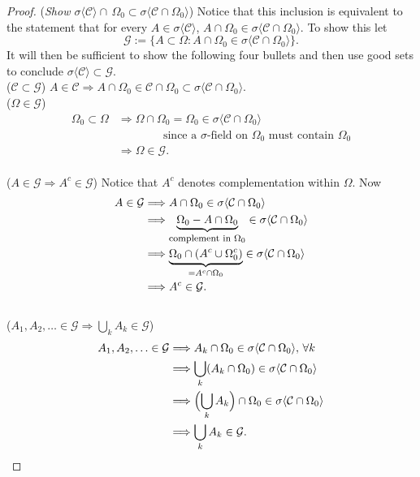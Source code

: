 \begin{proof}
({\sl Show  $\sigma\langle \mathcal C \rangle \cap\, \Omega_0 \subset \sigma \langle  \mathcal C \cap \Omega_0 \rangle $})  Notice that this inclusion is
equivalent to the statement that for every $A\in \sigma\langle\mathcal C\rangle$, $A\cap \Omega_0\in \sigma\langle\mathcal C\cap \Omega_0\rangle.$  To show this  let
\[ \mathcal G:=\{ A\subset \Omega: A\cap \Omega_0 \in \sigma\langle \mathcal C \cap \Omega_0 \rangle \}. \]
It will then be sufficient to show the following four bullets and then use good sets to conclude $\sigma\langle\mathcal C \rangle\subset \mathcal G$.
\\
\textbullet($\mathcal C\subset \mathcal G$)
$A\in \mathcal C \Longrightarrow A\cap \Omega_0\in \mathcal C \cap \Omega_0 \subset \sigma\langle \mathcal C \cap \Omega_0 \rangle.  $
\\
\textbullet($\Omega \in \mathcal G$)
\begin{align*}
\Omega_0\subset \Omega
&\Longrightarrow \Omega \cap \Omega_0 = \Omega_0 \in \sigma\langle \mathcal C\cap \Omega_0\rangle\\
&\qquad\qquad\text{since a  $\sigma$-field on $\Omega_0$ must contain $\Omega_0$} \\
&\Longrightarrow \Omega \in \mathcal G.
\end{align*}
\\
\textbullet($A\in \mathcal G\Longrightarrow A^c \in \mathcal G$) Notice that $A^c$  denotes complementation within $\Omega$. Now
\begin{align*}
A\in\mathcal G&\Longrightarrow A\cap \Omega_0\in \sigma\langle \mathcal C\cap \Omega_0\rangle \\
&\Longrightarrow \underbrace{\Omega_0-A\cap \Omega_0}_\text{\footnotesize complement in $\Omega_0$}\in \sigma\langle \mathcal C\cap \Omega_0\rangle \\
&\Longrightarrow \underbrace{\Omega_0\cap (A^c\cup \Omega_0^c)}_{= A^c\cap\Omega_0}\in \sigma\langle \mathcal C\cap \Omega_0\rangle \\
&\Longrightarrow A^c\in\mathcal G.
\end{align*}
\\
\textbullet($A_1,A_2,\ldots \in \mathcal G \Longrightarrow \bigcup_k A_k\in \mathcal G$)
\begin{align*}
A_1,A_2,\ldots \in \mathcal G&\Longrightarrow A_k\cap \Omega_0 \in \sigma\langle \mathcal C\cap \Omega_0\rangle,\,\forall k \\
&\Longrightarrow  \bigcup_k (A_k\cap \Omega_0) \in\sigma\langle \mathcal C\cap \Omega_0\rangle \\
 &\Longrightarrow  \Bigl(\bigcup_k A_k\Bigr)\cap \Omega_0 \in\sigma\langle \mathcal C\cap \Omega_0\rangle \\
&\Longrightarrow  \bigcup_k A_k\in \mathcal G.
\end{align*}
\end{proof}


